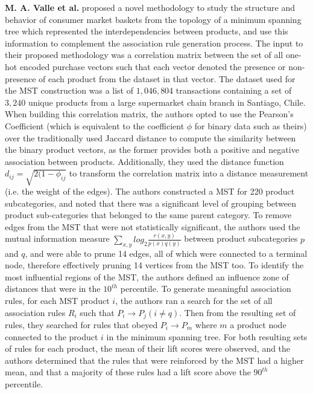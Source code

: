 \documentclass[a4paper,11pt]{article}
\begin{document}
\textbf{M. A. Valle et al.} \cite{mst_paper} proposed a novel methodology to study the structure and behavior of consumer market baskets from the topology of a minimum spanning tree which represented the interdependencies between products, and use this information to complement the association rule generation process. The input to their proposed methodology was a correlation matrix between the set of all one-hot encoded purchase vectors such that each vector denoted the presence or non-presence of each product from the dataset in that vector.  The dataset used for the MST construction was a list of $1,046,804$ transactions containing a set of $3,240$ unique products from a large supermarket chain branch in Santiago, Chile.  When building this correlation matrix, the authors opted to use the Pearson's Coefficient (which is equivalent to the coefficient $\phi$ for binary data such as theirs) over the traditionally used Jaccard distance to compute the similarity between the binary product vectors, as the former provides both a positive and negative association between products. Additionally,  they used the distance function $d_{ij} = \sqrt{2(1-\phi_{ij}}$ to transform the correlation matrix into a distance measurement (i.e. the weight of the edges).  The authors constructed a MST for 220 product subcategories, and noted that there was a significant level of grouping between product sub-categories that belonged to the same parent category.  To remove edges from the MST that were not statistically significant,  the authors used the mutual information \cite{measure} measure $\sum\limits_{x,y}log_2 \frac{r(x,y)}{p(x)q(y)}$ between product subcategories $p$ and $q$, and were able to prune 14 edges, all of which were connected to a terminal node, therefore effectively pruning 14 vertices from the MST too. To identify the most influential regions of the MST, the authors defined an influence zone of distances that were in the $10^{th}$ percentile. To generate meaningful association rules,  for each MST product $i$, the authors ran a search for the set of all association rules $R_i$ such that $P_i \rightarrow P_j (i \neq q)$. Then from the resulting set of rules, they searched for rules that obeyed $P_i \rightarrow P_m$ where $m$ a product node connected to the product $i$ in the minimum spanning tree.  For both resulting sets of rules for each product, the mean of their lift scores were observed, and the authors determined that the rules that were reinforced by the MST had a higher mean, and that a majority of these rules had a lift score above the $90^{th}$ percentile. 
\end{document}
